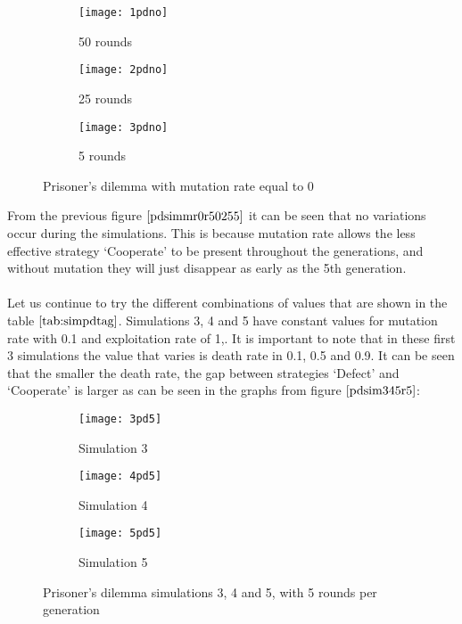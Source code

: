 \begin{figure}[H]       
    \centering
    \begin{subfigure}[b]{0.3\textwidth}
	\centering
	{\texttt{[image: 1pdno]}}   
    	\caption{50 rounds}
	\label{fig:1pdmr0}
    \end{subfigure}
    \hfill
    \begin{subfigure}[b]{0.3\textwidth}
	\centering
	{\texttt{[image: 2pdno]}}   
    	\caption{25 rounds}
	\label{fig:2pdmr0}
    \end{subfigure}
    \hfill
    \begin{subfigure}[b]{0.3\textwidth}
	\centering
	{\texttt{[image: 3pdno]}}   
    	\caption{5 rounds}
	\label{fig:3pdmr0}
    \end{subfigure}
    \caption{Prisoner's dilemma with mutation rate equal to 0}
    \label{pdsimmr0r50255}
\end{figure}

From the previous figure $\ref{pdsimmr0r50255}$ it can be seen that no variations occur during the simulations. This is because mutation rate allows the less effective strategy `Cooperate' to be present throughout the generations, and without mutation they will just disappear as early as the 5th generation. 
\\\\Let us continue to try the different combinations of values that are shown in the table $\ref{tab:simpdtag}$. 
Simulations 3, 4 and 5 have constant values for mutation rate with 0.1 and exploitation rate of 1,. It is important to note that in these first 3 simulations the value that varies is death rate in 0.1, 0.5 and 0.9. It can be seen that the smaller the death rate, the gap between strategies `Defect' and `Cooperate' is larger as can be seen in the graphs from figure $\ref{pdsim345r5}$:

\begin{figure}[H]       
    \centering
    \begin{subfigure}[b]{0.3\textwidth}
	\centering
	{\texttt{[image: 3pd5]}}   
    	\caption{Simulation 3}
	\label{fig:pds3}
    \end{subfigure}
    \hfill
    \begin{subfigure}[b]{0.3\textwidth}
	\centering
	{\texttt{[image: 4pd5]}}   
    	\caption{Simulation 4}
	\label{fig:pds4}
    \end{subfigure}
    \hfill
    \begin{subfigure}[b]{0.3\textwidth}
	\centering
	{\texttt{[image: 5pd5]}}   
    	\caption{Simulation 5}
	\label{fig:pds5}
    \end{subfigure}
    \caption{Prisoner's dilemma simulations 3, 4 and 5, with 5 rounds per generation}
    \label{pdsim345r5}
\end{figure}


